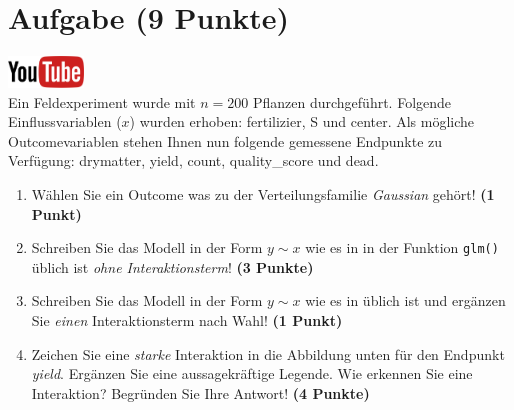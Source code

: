 \documentclass[a4paper, 9pt]{scrartcl}\usepackage[]{graphicx}\usepackage[]{xcolor}
\begin{document}
\section{Aufgabe \hfill (9 Punkte)}

\hfill\href{https://youtu.be/AwQEcQWLFCw}{\includegraphics[width =
  2cm]{img/youtube}}\\[1Ex]



Ein Feldexperiment wurde mit $n = 200$ Pflanzen durchgef{\"u}hrt. Folgende
Einflussvariablen ($x$) wurden erhoben: fertilizier, S und center. Als m{\"o}gliche Outcomevariablen stehen Ihnen nun
folgende gemessene Endpunkte zu Verf{\"u}gung: drymatter, yield, count, quality\_score und dead.

\begin{enumerate}
\item W{\"a}hlen Sie ein Outcome was zu der Verteilungsfamilie
  \textit{Gaussian} geh{\"o}rt! \textbf{(1 Punkt)}
\item Schreiben Sie das Modell in der Form $y \sim x$ wie es in \Rlogo in
  der Funktion \texttt{glm()}
  {\"u}blich ist \textit{ohne Interaktionsterm}! \textbf{(3 Punkte)}
\item Schreiben Sie das Modell in der Form $y \sim x$ wie es in \Rlogo
  {\"u}blich ist und erg{\"a}nzen Sie \textit{einen} Interaktionsterm nach Wahl! \textbf{(1 Punkt)} 
\item Zeichen Sie eine \textit{starke}
  Interaktion in die Abbildung unten f{\"u}r den Endpunkt
  \textit{yield}. Erg{\"a}nzen Sie eine aussagekr{\"a}ftige Legende. Wie erkennen
  Sie eine Interaktion? Begr{\"u}nden Sie Ihre Antwort! \textbf{(4 Punkte)}
\end{enumerate}
\end{document}
